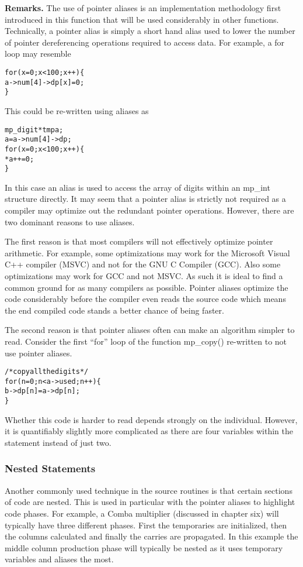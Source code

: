 \documentclass[b5paper]{book}
\begin{document}
\textbf{Remarks.}  The use of pointer aliases is an implementation methodology first introduced in this function that will
be used considerably in other functions.  Technically, a pointer alias is simply a short hand alias used to lower the 
number of pointer dereferencing operations required to access data.  For example, a for loop may resemble

\begin{alltt}
for (x = 0; x < 100; x++) \{
    a->num[4]->dp[x] = 0;
\}
\end{alltt}

This could be re-written using aliases as 

\begin{alltt}
mp_digit *tmpa;
a = a->num[4]->dp;
for (x = 0; x < 100; x++) \{
    *a++ = 0;
\}
\end{alltt}

In this case an alias is used to access the 
array of digits within an mp\_int structure directly.  It may seem that a pointer alias is strictly not required 
as a compiler may optimize out the redundant pointer operations.  However, there are two dominant reasons to use aliases.

The first reason is that most compilers will not effectively optimize pointer arithmetic.  For example, some optimizations 
may work for the Microsoft Visual C++ compiler (MSVC) and not for the GNU C Compiler (GCC).  Also some optimizations may 
work for GCC and not MSVC.  As such it is ideal to find a common ground for as many compilers as possible.  Pointer 
aliases optimize the code considerably before the compiler even reads the source code which means the end compiled code 
stands a better chance of being faster.

The second reason is that pointer aliases often can make an algorithm simpler to read.  Consider the first ``for'' 
loop of the function mp\_copy() re-written to not use pointer aliases.

\begin{alltt}
    /* copy all the digits */
    for (n = 0; n < a->used; n++) \{
      b->dp[n] = a->dp[n];
    \}
\end{alltt}

Whether this code is harder to read depends strongly on the individual.  However, it is quantifiably slightly more 
complicated as there are four variables within the statement instead of just two.

\subsubsection{Nested Statements}
Another commonly used technique in the source routines is that certain sections of code are nested.  This is used in
particular with the pointer aliases to highlight code phases.  For example, a Comba multiplier (discussed in chapter six)
will typically have three different phases.  First the temporaries are initialized, then the columns calculated and 
finally the carries are propagated.  In this example the middle column production phase will typically be nested as it
uses temporary variables and aliases the most.
\end{document}

